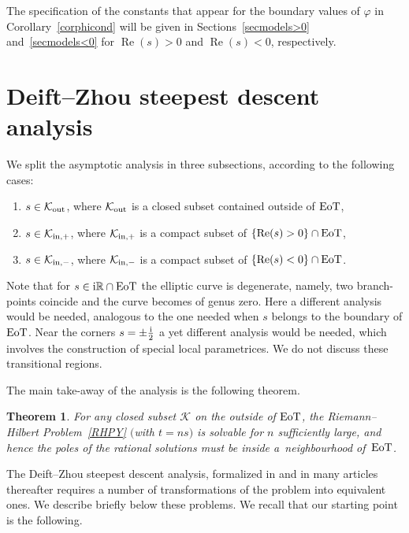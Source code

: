 \documentclass[pdftex]{sigma}
\numberwithin{equation}{section}
\newtheorem{Theorem}{Theorem}[section]
\theoremstyle{definition}
\def\R{{\mathbb R}}
\def \Re{\operatorname{Re} }
\begin{document}
The specification of the constants that appear for the boundary values of $\varphi$ in Corollary~\ref{corphicond} will be given in Sections~\ref{secmodels>0} and~\ref{secmodels<0} for $\Re(s)>0$ and $\Re(s)<0$, respectively.

\section{Deift--Zhou steepest descent analysis}
 We split the asymptotic analysis in three subsections, according to the following cases:
 \begin{enumerate}\itemsep=0pt
 \item[(1)] $s\in \mathcal K_{\rm out}$, where ${\mathcal K_{\rm out}}$ is a closed subset contained outside of ${\rm EoT}$,
 \item[(2)] $s\in \mathcal K_{{\rm in},+}$, where ${\mathcal K_{{\rm in},+}}$ is a compact subset of $\{\Re (s)>0\}\cap {\rm EoT}$,
 \item[(3)] $s\in \mathcal K_{{\rm in},-}$, where ${\mathcal K_{{\rm in},-}}$ is a compact subset of $\{\Re (s)<0\}\cap {\rm EoT}$.
 \end{enumerate}
 Note that for $s\in {\rm i}\R\cap {\rm EoT}$ the elliptic curve is degenerate, namely, two branch-points coincide and the curve becomes of genus zero. Here a different analysis would be needed, analogous to the one needed when $s$ belongs to the boundary of ${\rm EoT}$. Near the corners $s=\pm \frac {\rm i}2$ a yet different analysis would be needed, which involves the construction of special local parametrices. We do not discuss these transitional regions.

The main take-away of the analysis is the following theorem.
\begin{Theorem}
For any closed subset $\mathcal K$ on the outside of ${\rm EoT}$, the Riemann--Hilbert Problem~{\rm\ref{RHPY}} $($with $t=ns)$ is solvable for $n$ sufficiently large, and hence the poles of the rational solutions must be inside a~neighbourhood of~${\rm EoT}$.
\end{Theorem}

The Deift--Zhou steepest descent analysis, formalized in \cite{DZ} and in many articles thereafter requires a number of transformations of the problem into equivalent ones. We describe briefly below these problems.
We recall that our starting point is the following.
\end{document}
